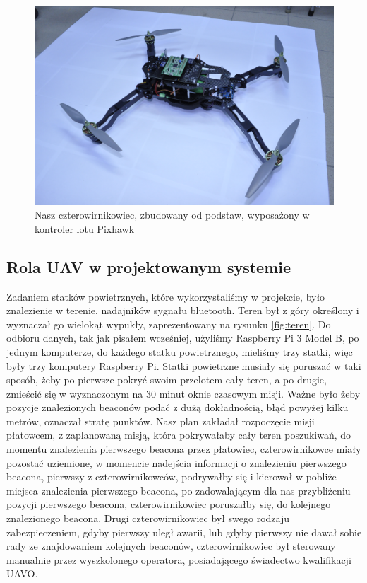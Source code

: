 \begin{figure}[!th]
    \centering
    \includegraphics[width=15cm]{zalaczniki/obrazy/dron_czarny.jpg}
    \caption{Nasz czterowirnikowiec, zbudowany od podstaw, wyposażony w kontroler lotu Pixhawk}
    \label{fig:dronczarny}
\end{figure}


\subsection{Rola UAV w projektowanym systemie}

Zadaniem statków powietrznych, które wykorzystaliśmy w projekcie, było znalezienie w terenie, nadajników sygnału bluetooth. Teren był z góry określony i wyznaczał go wielokąt wypukły, zaprezentowany na rysunku \ref{fig:teren}. Do odbioru danych, tak jak pisałem wcześniej, użyliśmy Raspberry Pi 3 Model B, po jednym komputerze, do każdego statku powietrznego, mieliśmy trzy statki, więc były trzy komputery Raspberry Pi. Statki powietrzne musiały się poruszać w taki sposób, żeby po pierwsze pokryć swoim przelotem cały teren, a po drugie, zmieścić się w wyznaczonym na 30 minut oknie czasowym misji. Ważne było żeby pozycje znalezionych beaconów podać z dużą dokładnością, błąd powyżej kilku metrów, oznaczał stratę punktów. Nasz plan zakładał rozpoczęcie misji płatowcem, z zaplanowaną misją, która pokrywałaby cały teren poszukiwań, do momentu znalezienia pierwszego beacona przez płatowiec, czterowirnikowce miały pozostać uziemione, w momencie nadejścia informacji o znalezieniu pierwszego beacona, pierwszy z czterowirnikowców, podrywałby się i kierował w pobliże miejsca znalezienia pierwszego beacona, po zadowalającym dla nas przybliżeniu pozycji pierwszego beacona, czterowirnikowiec poruszałby się, do kolejnego znalezionego beacona. Drugi czterowirnikowiec był swego rodzaju zabezpieczeniem, gdyby pierwszy uległ awarii, lub gdyby pierwszy nie dawał sobie rady ze znajdowaniem kolejnych beaconów, czterowirnikowiec był sterowany manualnie przez wyszkolonego operatora, posiadającego świadectwo kwalifikacji UAVO.

